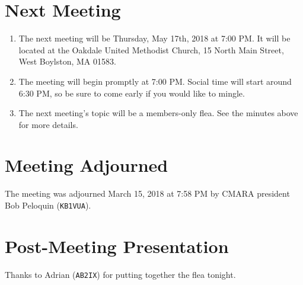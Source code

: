 \documentclass[10pt,letterpaper]{article}
\begin{document}
\section{Next Meeting}
\begin{enumerate}
  \item The next meeting will be Thursday, May 17th, 2018 at 7:00 PM. It will be located at the Oakdale United Methodist Church, 15 North Main Street, West Boylston, MA 01583.
  \item The meeting will begin promptly at 7:00 PM. Social time will start around 6:30 PM, so be sure to come early if you would like to mingle.
  \item The next meeting's topic will be a members-only flea. See the minutes above for more details.
\end{enumerate}

\section{Meeting Adjourned}
The meeting was adjourned March 15, 2018 at 7:58 PM by CMARA president Bob Peloquin (\texttt{KB1VUA}).

\section{Post-Meeting Presentation}
Thanks to Adrian (\texttt{AB2IX}) for putting together the flea tonight.
\end{document}
